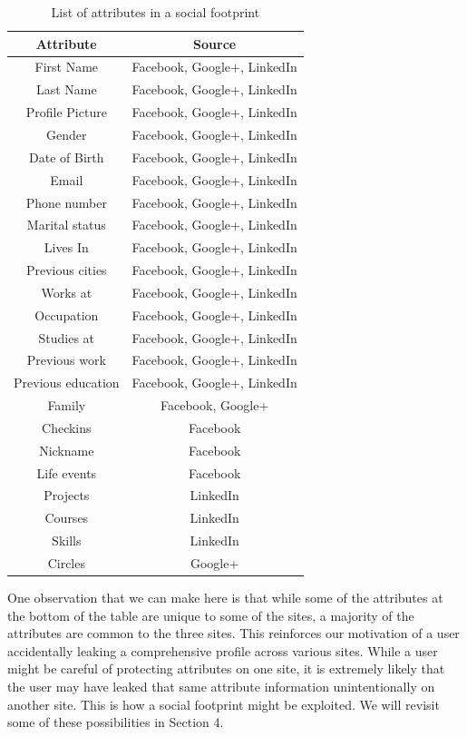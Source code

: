 \documentclass[10pt,conference]{IEEEtran}
\begin{document}
\begin{table}
	\normalsize
	\centering
 		\begin{tabular}{|| c | c ||} 
 		\hline
 		Attribute & Source\\  
		\hline\hline
		First Name & Facebook, Google+, LinkedIn \\
		\hline
		Last Name & Facebook, Google+, LinkedIn \\
		\hline
		Profile Picture & Facebook, Google+, LinkedIn \\
		\hline
		Gender & Facebook, Google+, LinkedIn \\
		\hline
		Date of Birth & Facebook, Google+, LinkedIn \\
		\hline
		Email & Facebook, Google+, LinkedIn \\
		\hline
		Phone number & Facebook, Google+, LinkedIn \\
		\hline
		Marital status & Facebook, Google+, LinkedIn \\
		\hline
		Lives In & Facebook, Google+, LinkedIn \\
		\hline
		Previous cities & Facebook, Google+, LinkedIn \\
		\hline
		Works at & Facebook, Google+, LinkedIn \\
		\hline
		Occupation & Facebook, Google+, LinkedIn \\
		\hline
		Studies at & Facebook, Google+, LinkedIn \\
		\hline
		Previous work & Facebook, Google+, LinkedIn \\
		\hline
		Previous education & Facebook, Google+, LinkedIn \\
		\hline
		Family & Facebook, Google+ \\
		\hline
		Checkins & Facebook \\
		\hline
		Nickname & Facebook \\
		\hline
		Life events & Facebook \\
		\hline
		Projects & LinkedIn \\
		\hline
		Courses & LinkedIn \\
		\hline
		Skills & LinkedIn \\
		\hline		
		Circles & Google+ \\
		\hline
	\end{tabular}
\caption{List of attributes in a social footprint}
\end{table}

One observation that we can make here is that while some of the attributes at the bottom of the table are unique to some of the sites, a majority of the attributes are common to the three sites. This reinforces our motivation of a user accidentally leaking a comprehensive profile across various sites. While a user might be careful of protecting attributes on one site, it is extremely likely that the user may have leaked that same attribute information unintentionally on another site. This is how a social footprint might be exploited. We will revisit some of these possibilities in Section 4.
\end{document}
